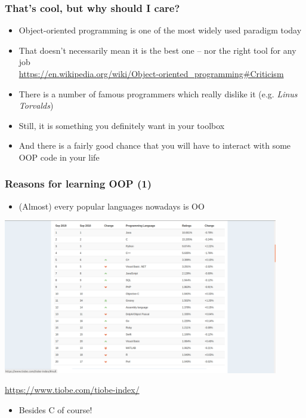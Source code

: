 \documentclass[9pt]{beamer}
\begin{document}
\begin{frame}
  \frametitle{That's cool, but why should I care?}
  
  \begin{itemize}
    \item Object-oriented programming is one of the most widely used paradigm today
    \smallskip
    \item That doesn't necessarily mean it is the best one -- nor the right tool for any job \\
    \tiny
    \url{https://en.wikipedia.org/wiki/Object-oriented_programming\#Criticism}
    \normalsize
    \smallskip
        
    \item There is a number of famous programmers which really dislike it (e.g. \emph{Linus Torvalds})
    \medskip
    \item Still, it is something you definitely want in your toolbox
    \medskip
    \item And there is a fairly good chance that you will have to interact with some OOP
          code in your life
    \smallskip

    
  \end{itemize}
  
\end{frame}


\begin{frame}
  \frametitle{Reasons for learning OOP (1)}
  
  \begin{itemize}
    \item (Almost) every popular languages nowadays is OO
  \end{itemize}
  
  \smallskip
  
  \centering\includegraphics[width=0.9\textwidth]{thiobe.png}
  
  \smallskip
  
  \tiny \url{https://www.tiobe.com/tiobe-index/} \normalsize
  
  \smallskip
  
  \begin{itemize}
    \item Besides C of course!
  \end{itemize}
  
\end{frame}
\end{document}
